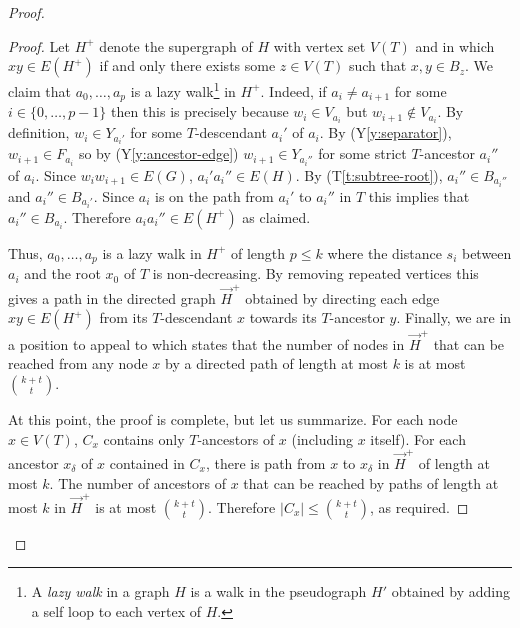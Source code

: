 \documentclass{patmorin}
\newcommand{\tref}[1]{(T\ref{t:#1})}
\newcommand{\yref}[1]{(Y\ref{y:#1})}
\renewcommand{\le}{\leqslant}
\begin{document}
\begin{proof}
\begin{proof}
  Let $H^+$ denote the supergraph of $H$ with vertex set $V(T)$ and in which $xy\in E(H^+)$ if and only there exists some $z\in V(T)$ such that $x,y\in B_z$. 
  We claim that $a_0,\ldots,a_p$ is a lazy walk\footnote{A \emph{lazy walk} in a graph $H$ is a walk in the pseudograph $H'$ obtained by adding a self loop to each vertex of $H$.} in $H^+$.  Indeed, if $a_i\neq a_{i+1}$ for some $i\in\{0,\ldots,p-1\}$ then this is precisely because $w_i\in V_{a_i}$ but $w_{i+1}\not\in V_{a_i}$.  By definition, $w_i\in Y_{a_i'}$ for some $T$-descendant $a_i'$ of $a_i$.
  By \yref{separator}, $w_{i+1}\in F_{a_i}$ so by \yref{ancestor-edge} $w_{i+1}\in Y_{a_i''}$ for some strict $T$-ancestor $a_i''$ of $a_i$.  Since $w_iw_{i+1}\in E(G)$, $a_i'a_i''\in E(H)$.  By \tref{subtree-root}, $a_i''\in B_{a_i''}$ and $a_i''\in B_{a_i'}$.  Since $a_i$ is on the path from $a_i'$ to $a_i''$ in $T$ this implies that $a_i''\in B_{a_i}$.  Therefore $a_ia_i''\in E(H^+)$ as claimed.
  
  Thus, $a_0,\ldots,a_p$ is a lazy walk in $H^+$ of length $p\le k$ where the distance $s_i$ between $a_i$ and the root $x_0$ of $T$ is non-decreasing.  By removing repeated vertices this gives a path in the directed graph $\overrightarrow{H}^+$ obtained by directing each edge $xy\in E(H^+)$ from its $T$-descendant $x$ towards its $T$-ancestor $y$. 
  Finally, we are in a position to appeal to \cite[Lemma~24]{pilipczuk.siebertz:polynomial-soda} which states that the number of nodes in $\overrightarrow{H}^+$ that can be reached from any node $x$ by a directed path of length at most $k$ is at most $\binom{k+t}{t}$.
  
  At this point, the proof is complete, but let us summarize. For each node $x\in V(T)$, $C_x$ contains only $T$-ancestors of $x$ (including $x$ itself).  For each ancestor $x_\delta$ of $x$ contained in $C_x$, there is path from $x$ to $x_\delta$ in $\overrightarrow{H}^+$ of length at most $k$.  The number of ancestors of $x$ that can be reached by paths of length at most $k$ in $\overrightarrow{H}^+$ is at most $\binom{k+t}{t}$.  Therefore $|C_x|\le \binom{k+t}{t}$, as required.
\end{proof}



\end{proof}
\end{document}
